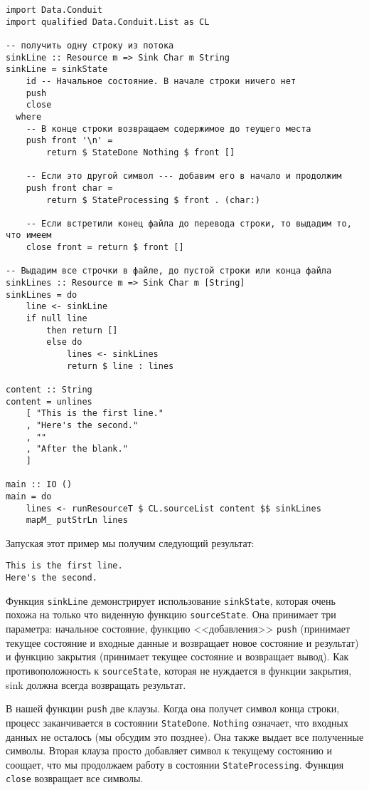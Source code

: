 \begin{lstlisting}
import Data.Conduit
import qualified Data.Conduit.List as CL

-- получить одну строку из потока
sinkLine :: Resource m => Sink Char m String
sinkLine = sinkState
    id -- Начальное состояние. В начале строки ничего нет
    push
    close
  where
    -- В конце строки возвращаем содержимое до теущего места
    push front '\n' =
        return $ StateDone Nothing $ front []

    -- Если это другой символ --- добавим его в начало и продолжим
    push front char =
        return $ StateProcessing $ front . (char:)

    -- Если встретили конец файла до перевода строки, то выдадим то, что имеем
    close front = return $ front []

-- Выдадим все строчки в файле, до пустой строки или конца файла
sinkLines :: Resource m => Sink Char m [String]
sinkLines = do
    line <- sinkLine
    if null line
        then return []
        else do
            lines <- sinkLines
            return $ line : lines

content :: String
content = unlines
    [ "This is the first line."
    , "Here's the second."
    , ""
    , "After the blank."
    ]

main :: IO ()
main = do
    lines <- runResourceT $ CL.sourceList content $$ sinkLines
    mapM_ putStrLn lines
\end{lstlisting}
Запуская этот пример мы получим следующий результат:
\begin{verbatim}
This is the first line.
Here's the second.
\end{verbatim}

Функция \lstinline=sinkLine= демонстрирует использование \lstinline=sinkState=, которая
очень похожа на только что
виденную функцию \lstinline=sourceState=. Она принимает три параметра: начальное
состояние,
функцию <<добавления>> \verb=push= 
(принимает текущее состояние и входные данные и возвращает новое состояние и результат)
и функцию закрытия (принимает текущее состояние и возвращает вывод). Как
противоположность к \lstinline=sourceState=, которая не нуждается в функции закрытия, sink
должна всегда возвращать результат.

В нашей функции \lstinline=push= две клаузы. Когда она получет символ конца строки,
процесс заканчивается в состоянии \lstinline=StateDone=. \lstinline=Nothing= означает, что
входных данных не
осталось (мы обсудим это позднее). Она также выдает все полученные символы. Вторая
клауза просто добавляет символ к текущему состоянию и соощает, что мы продолжаем работу
в состоянии \lstinline=StateProcessing=. Функция \lstinline=close= возвращает все символы.

